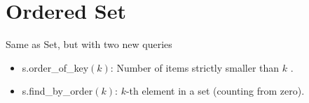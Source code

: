 \section{Ordered Set}
Same as Set, but with two new queries
\begin{itemize}
    \item s.order\_of\_key$(k)$: Number of items strictly smaller than $k$ .
    \item s.find\_by\_order$(k)$: $k$-th element in a set (counting from zero).
\end{itemize}

